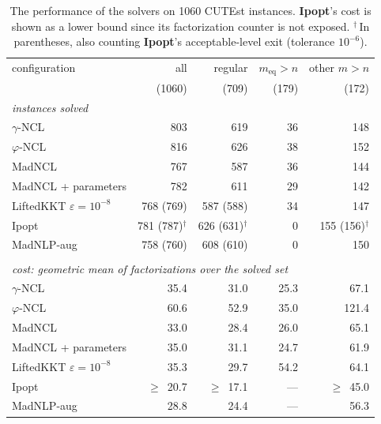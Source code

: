 \begin{table}[hbp]\centering
\caption{The performance of the solvers on 1060 CUTEst instances. \textbf{Ipopt}'s cost is shown as a lower bound since its factorization counter is not exposed. $^{\dagger}$\,In parentheses, also counting \textbf{Ipopt}'s acceptable-level exit (tolerance $10^{-6}$).}
\label{tab:cutest}
\begin{tabular}{lrrrr}\toprule
configuration & all & regular & $m_{\mathrm{eq}}>n$ & other $m>n$ \\
 & (1060) & (709) & (179) & (172) \\\midrule
\multicolumn{5}{l}{\emph{instances solved}}\\
$\gamma$-NCL & 803 & 619 & 36 & 148 \\
$\varphi$-NCL & 816 & 626 & 38 & 152 \\
MadNCL & 767 & 587 & 36 & 144 \\
MadNCL + parameters & 782 & 611 & 29 & 142 \\
LiftedKKT $\varepsilon=10^{-8}$ & 768 (769) & 587 (588) & 34 & 147 \\
Ipopt & 781 (787)$^{\dagger}$ & 626 (631)$^{\dagger}$ & 0 & 155 (156)$^{\dagger}$ \\
MadNLP-aug & 758 (760) & 608 (610) & 0 & 150 \\
\\[-6pt]
\multicolumn{5}{l}{\emph{cost: geometric mean of factorizations over the solved set}}\\
$\gamma$-NCL & 35.4 & 31.0 & 25.3 & 67.1 \\
$\varphi$-NCL & 60.6 & 52.9 & 35.0 & 121.4 \\
MadNCL & 33.0 & 28.4 & 26.0 & 65.1 \\
MadNCL + parameters & 35.0 & 31.1 & 24.7 & 61.9 \\
LiftedKKT $\varepsilon=10^{-8}$ & 35.3 & 29.7 & 54.2 & 64.1 \\
Ipopt & $\geq$~20.7 & $\geq$~17.1 & --- & $\geq$~45.0 \\
MadNLP-aug & 28.8 & 24.4 & --- & 56.3 \\
\bottomrule\end{tabular}
\end{table}
